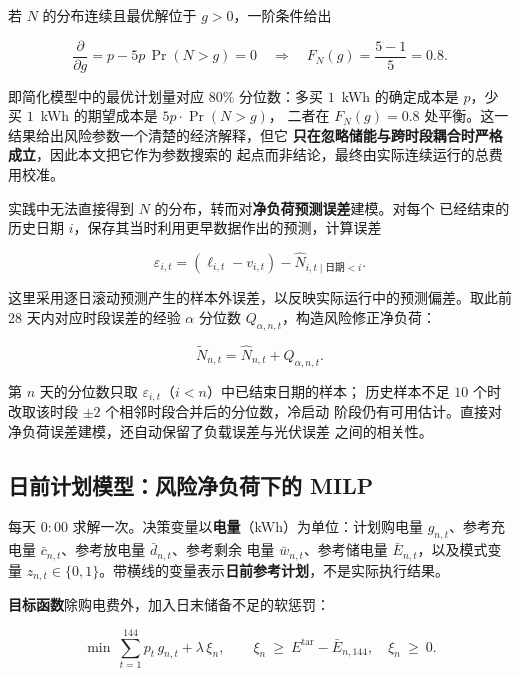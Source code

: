 \documentclass[withoutpreface,bwprint]{cumcmthesis}
\begin{document}
若 $N$ 的分布连续且最优解位于 $g>0$，一阶条件给出

\begin{equation}
  \frac{\partial}{\partial g}=p-5p\,\Pr(N>g)=0
  \quad\Longrightarrow\quad
  F_N(g)=\frac{5-1}{5}=0.8 .
  \label{eq:p2-critical}
\end{equation}

即简化模型中的最优计划量对应 $80\%$ 分位数：多买
$1$~kWh 的确定成本是 $p$，少买 $1$~kWh 的期望成本是 $5p\cdot\Pr(N>g)$，
二者在 $F_N(g)=0.8$ 处平衡。这一结果给出风险参数一个清楚的经济解释，但它
\textbf{只在忽略储能与跨时段耦合时严格成立}，因此本文把它作为参数搜索的
起点而非结论，最终由实际连续运行的总费用校准。

实践中无法直接得到 $N$ 的分布，转而对\textbf{净负荷预测误差}建模。对每个
已经结束的历史日期 $i$，保存其当时利用更早数据作出的预测，计算误差

\begin{equation}
  \varepsilon_{i,t}=(\ell_{i,t}-v_{i,t})-\widehat N_{i,t\mid\text{日期}<i} .
  \label{eq:p2-error}
\end{equation}

这里采用逐日滚动预测产生的样本外误差，以反映实际运行中的预测偏差。取此前
$28$ 天内对应时段误差的经验
$\alpha$ 分位数 $Q_{\alpha,n,t}$，构造风险修正净负荷：

\begin{equation}
  \widetilde N_{n,t}=\widehat N_{n,t}+Q_{\alpha,n,t} .
  \label{eq:p2-risk}
\end{equation}

第 $n$ 天的分位数只取 $\varepsilon_{i,t}$（$i<n$）中已结束日期的样本；
历史样本不足 $10$ 个时改取该时段 $\pm2$ 个相邻时段合并后的分位数，冷启动
阶段仍有可用估计。直接对净负荷误差建模，还自动保留了负载误差与光伏误差
之间的相关性。

\subsection{日前计划模型：风险净负荷下的 MILP}

每天 $0{:}00$ 求解一次。决策变量以\textbf{电量}（kWh）为单位：计划购电量
$g_{n,t}$、参考充电量 $\bar c_{n,t}$、参考放电量 $\bar d_{n,t}$、参考剩余
电量 $\bar w_{n,t}$、参考储电量 $\bar E_{n,t}$，以及模式变量
$z_{n,t}\in\{0,1\}$。带横线的变量表示\textbf{日前参考计划}，不是实际执行结果。

\textbf{目标函数}除购电费外，加入日末储备不足的软惩罚：

\begin{equation}
  \min\ \sum_{t=1}^{144}p_t\,g_{n,t}+\lambda\,\xi_n,
  \qquad
  \xi_n\ \ge\ E^{\mathrm{tar}}-\bar E_{n,144},\quad \xi_n\ \ge\ 0 .
  \label{eq:p2-obj}
\end{equation}
\end{document}

